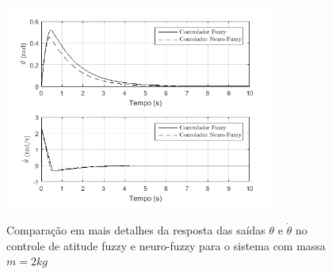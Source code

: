 \begin{figure}[!htb]
    \centering
    \caption{Comparação em mais detalhes da resposta das saídas $\theta$ e $\dot{\theta}$ no controle de atitude fuzzy e neuro-fuzzy para o sistema com massa $m=2kg$}
    \includegraphics[width=0.8\textwidth]{./04-figuras/resultados/novos/atitude_theta_thetadot_2kg_10s}
    \label{fig:atitude_theta_thetadot_2kg_10s}
\end{figure}